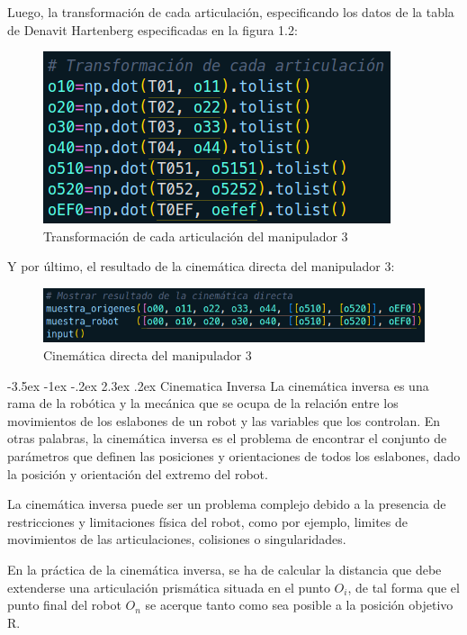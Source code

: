 \documentclass[11pt]{report}
\makeatletter
\renewcommand\chapter{\@startsection{chapter}{0}{\z@}%
    {-3.5ex \@plus -1ex \@minus -.2ex}%
    {2.3ex \@plus.2ex}%
    {\normalfont\Large\bfseries}}
\makeatother
\begin{document}
Luego, la transformación de cada articulación, especificando los datos de la tabla de Denavit Hartenberg especificadas en la figura 1.2:
\begin{figure}[H]
  \centering
  \includegraphics[scale=0.5]{img/transformacion_articulacion.png}
  \caption{Transformación de cada articulación del manipulador 3}
\end{figure}

Y por último, el resultado de la cinemática directa del manipulador 3:
\begin{figure}[H]
  \centering
  \includegraphics[scale=0.5]{img/resultado_cd.png}
  \caption{Cinemática directa del manipulador 3}
\end{figure}

\newpage

\chapter{Cinematica Inversa}
La cinemática inversa es una rama de la robótica y la mecánica que se ocupa de la relación entre los movimientos
de los eslabones de un robot y las variables que los controlan. En otras palabras, la cinemática inversa es el
problema de encontrar el conjunto de parámetros que definen las posiciones y orientaciones de todos los eslabones,
dado la posición y orientación del extremo del robot.

La cinemática inversa puede ser un problema complejo debido a la presencia de restricciones y limitaciones física
del robot, como por ejemplo, limites de movimientos de las articulaciones, colisiones o singularidades.

En la práctica de la cinemática inversa, se ha de calcular la distancia que debe extenderse una articulación prismática
situada en el punto $O_i$, de tal forma que el punto final del robot $O_n$ se acerque tanto como sea posible a la posición
objetivo R.
\end{document}
